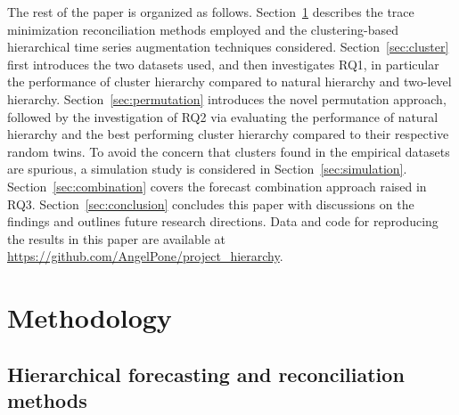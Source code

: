 \documentclass[a4paper,review,12pt,authoryear]{elsarticle}
\begin{document}
The rest of the paper is organized as follows. Section~\ref{sec:methodology} describes the trace minimization reconciliation methods employed and the clustering-based hierarchical time series augmentation techniques considered. Section~\ref{sec:cluster} first introduces the two datasets used, and then investigates RQ1, in particular the performance of cluster hierarchy compared to natural hierarchy and two-level hierarchy. Section~\ref{sec:permutation} introduces the novel permutation approach, followed by the investigation of RQ2 via evaluating the performance of natural hierarchy and the best performing cluster hierarchy compared to their respective random twins. To avoid the concern that clusters found in the empirical datasets are spurious, a simulation study is considered in Section~\ref{sec:simulation}. Section~\ref{sec:combination} covers the forecast combination approach raised in RQ3. Section~\ref{sec:conclusion} concludes this paper with discussions on the findings and outlines future research directions. 
Data and code for reproducing the results in this paper are available at \url{https://github.com/AngelPone/project_hierarchy}.



\section{Methodology}\label{sec:methodology}

\subsection{Hierarchical forecasting and reconciliation methods}

\end{document}
